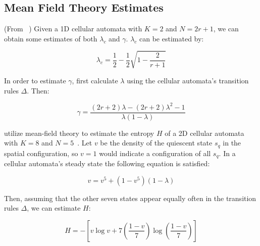 \documentclass[a4paper,11pt]{report}
\begin{document}
\begin{appendices}
\section{Mean Field Theory Estimates}
\label{appA:MFT}
(From \citeauthor{li90b}~\cite{li90b}) Given a 1D cellular automata with $K=2$ and $N = 2r+1$, we can obtain some estimates of both $\lambda_c$ and $\gamma$. $\lambda_c$ can be estimated by:

\begin{equation}
\lambda_c = \frac{1}{2} - \frac{1}{2}\sqrt{1 - \frac{2}{r+1}}
\end{equation}

In order to estimate $\gamma$, first calculate $\lambda$ using the cellular automata's transition rules $\Delta$. Then:

\begin{equation}
\gamma = \frac{(2r+2)\lambda - (2r + 2)\lambda^2 - 1}{\lambda(1-\lambda)}
\end{equation}

\pagebreak

\citeauthor{wo90} utilize mean-field theory to estimate the entropy $H$ of a 2D cellular automata with $K=8$ and $N=5$~\cite{wo90}. Let $v$ be the density of the quiescent state $s_q$ in the spatial configuration, so $v=1$ would indicate a configuration of all $s_q$. In a cellular automata's steady state the following equation is satisfied:

\begin{equation}
v = v^5 + (1 - v^5)(1- \lambda)
\end{equation}


Then, assuming that the other seven states appear equally often in the transition rules $\Delta$, we can estimate $H$:

\begin{equation}
H = -\left[ v \log v + 7\left(\frac{1-v}{7}\right)\log\left(\frac{1-v}{7}\right)\right]
\end{equation}

\end{appendices}



\end{document}
